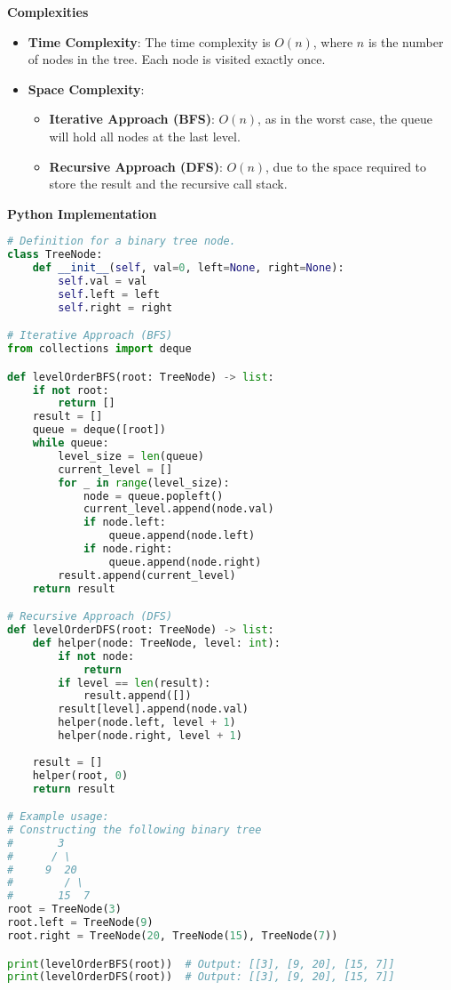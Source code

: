 \textbf{Complexities}

\begin{itemize}
    \item \textbf{Time Complexity}: The time complexity is \(O(n)\), where \(n\) is the number of nodes in the tree. Each node is visited exactly once.
    \item \textbf{Space Complexity}:
    \begin{itemize}
        \item \textbf{Iterative Approach (BFS)}: \(O(n)\), as in the worst case, the queue will hold all nodes at the last level.
        \item \textbf{Recursive Approach (DFS)}: \(O(n)\), due to the space required to store the result and the recursive call stack.
    \end{itemize}
\end{itemize}

\textbf{Python Implementation}

\begin{lstlisting}[language=Python, xleftmargin=0.02\textwidth, xrightmargin=0.02\textwidth]
# Definition for a binary tree node.
class TreeNode:
    def __init__(self, val=0, left=None, right=None):
        self.val = val
        self.left = left
        self.right = right

# Iterative Approach (BFS)
from collections import deque

def levelOrderBFS(root: TreeNode) -> list:
    if not root:
        return []
    result = []
    queue = deque([root])
    while queue:
        level_size = len(queue)
        current_level = []
        for _ in range(level_size):
            node = queue.popleft()
            current_level.append(node.val)
            if node.left:
                queue.append(node.left)
            if node.right:
                queue.append(node.right)
        result.append(current_level)
    return result

# Recursive Approach (DFS)
def levelOrderDFS(root: TreeNode) -> list:
    def helper(node: TreeNode, level: int):
        if not node:
            return
        if level == len(result):
            result.append([])
        result[level].append(node.val)
        helper(node.left, level + 1)
        helper(node.right, level + 1)
    
    result = []
    helper(root, 0)
    return result

# Example usage:
# Constructing the following binary tree
#       3
#      / \
#     9  20
#        / \
#       15  7
root = TreeNode(3)
root.left = TreeNode(9)
root.right = TreeNode(20, TreeNode(15), TreeNode(7))

print(levelOrderBFS(root))  # Output: [[3], [9, 20], [15, 7]]
print(levelOrderDFS(root))  # Output: [[3], [9, 20], [15, 7]]
\end{lstlisting}

